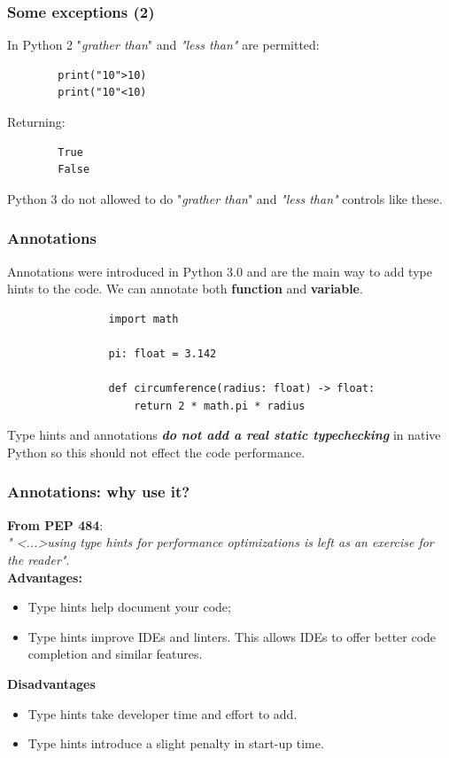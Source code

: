 \documentclass[xcolor ={table,usenames,dvipsnames}]{beamer}
\theoremstyle{definition}
\begin{document}
	\begin{frame}[fragile]
		\frametitle{Some exceptions (2)}
		In Python 2 "\textit{grather than}" and \textit{"less than"} are permitted:
		
		\begin{lstlisting}
		print("10">10)
		print("10"<10)
		\end{lstlisting}
		
		Returning:
		
		\begin{lstlisting}
		True
		False
		\end{lstlisting}
		
		Python 3 do not allowed to do "\textit{grather than}" and \textit{"less than"} controls like these.\\	
	\end{frame}

	\begin{frame}[fragile]
		\frametitle{Annotations}
			Annotations were introduced in Python 3.0 and are the main way to add type hints to the code. We can annotate both \textbf{function} and \textbf{variable}.
			
			\begin{lstlisting}
				import math
				
				pi: float = 3.142
				
				def circumference(radius: float) -> float:
					return 2 * math.pi * radius
			\end{lstlisting}
			
			Type hints and annotations \textbf{\textit{do not add a real static typechecking}} in native Python so this should not effect the code performance.\\
	\end{frame}

	\begin{frame}
		\frametitle{Annotations: why use it?}
		\textbf{From PEP 484}:\\
		\textit{" <...>using type hints for performance optimizations is left as an exercise for the reader"}.\\
		
		\textbf{Advantages:}
		\begin{itemize}
			\item Type hints help document your code;
			\item Type hints improve IDEs and linters. This allows IDEs to offer better code completion and similar features.
		\end{itemize}
		\textbf{Disadvantages}
		\begin{itemize}
			\item Type hints take developer time and effort to add.
			\item Type hints introduce a slight penalty in start-up time.
		\end{itemize}
	\end{frame}
\end{document}
